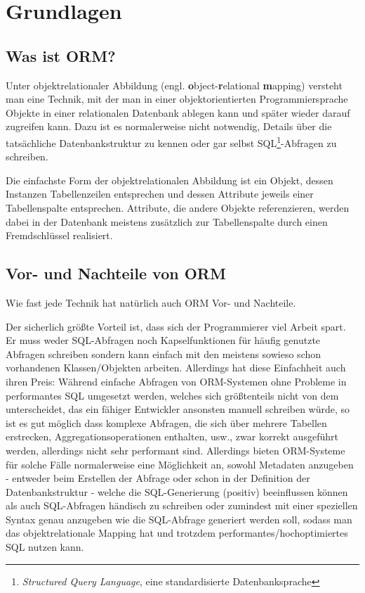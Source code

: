 \chapter{Grundlagen}

\section{Was ist ORM?}

Unter objektrelationaler Abbildung
(engl. \textbf{o}bject-\textbf{r}elational \textbf{m}apping)
versteht man eine Technik, mit der man in einer objektorientierten
Programmiersprache Objekte in einer relationalen Datenbank ablegen kann und
später wieder darauf zugreifen kann. Dazu ist es normalerweise nicht
notwendig, Details über die tatsächliche Datenbankstruktur zu kennen oder gar
selbst SQL\footnote{\emph{Structured Query Language}, eine standardisierte
Datenbanksprache}-Abfragen zu schreiben.

Die einfachste Form der objektrelationalen Abbildung ist ein Objekt, dessen
Instanzen Tabellenzeilen entsprechen und dessen Attribute jeweils einer
Tabellenspalte entsprechen. Attribute, die andere Objekte referenzieren, werden
dabei in der Datenbank meistens zusätzlich zur Tabellenspalte durch einen
Fremdschlüssel realisiert.



\section{Vor- und Nachteile von ORM}

Wie fast jede Technik hat natürlich auch ORM Vor- und Nachteile.

Der sicherlich größte Vorteil ist, dass sich der Programmierer viel Arbeit
spart. Er muss weder SQL-Abfragen noch Kapselfunktionen für häufig genutzte
Abfragen schreiben sondern kann einfach mit den meistens sowieso schon
vorhandenen Klassen/Objekten arbeiten. Allerdings hat diese Einfachheit auch
ihren Preis: Während einfache Abfragen von ORM-Systemen ohne Probleme in
performantes SQL umgesetzt werden, welches sich größtenteils nicht von dem
unterscheidet, das ein fähiger Entwickler ansonsten manuell schreiben würde,
so ist es gut möglich dass komplexe Abfragen, die sich über mehrere Tabellen
erstrecken, Aggregationsoperationen enthalten, usw., zwar korrekt ausgeführt
werden, allerdings nicht sehr performant sind. Allerdings bieten ORM-Systeme
für solche Fälle normalerweise eine Möglichkeit an, sowohl Metadaten anzugeben -
entweder beim Erstellen der Abfrage oder schon in der Definition der
Datenbankstruktur - welche die SQL-Generierung (positiv) beeinflussen können als
auch SQL-Abfragen händisch zu schreiben oder zumindest mit einer speziellen
Syntax genau anzugeben wie die SQL-Abfrage generiert werden soll, sodass man
das objektrelationale Mapping hat und trotzdem performantes/hochoptimiertes SQL
nutzen kann.

